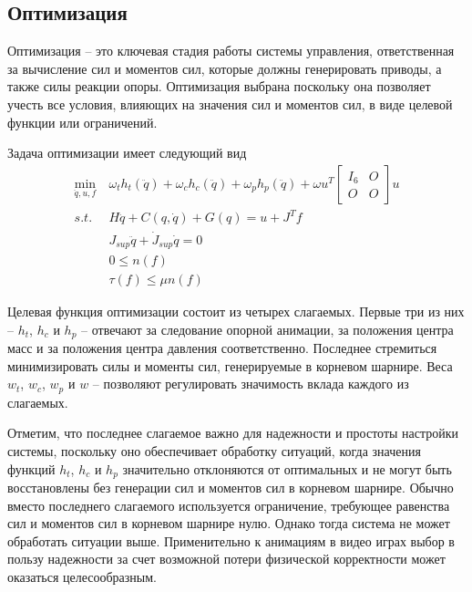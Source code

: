 \subsection{Оптимизация}

Оптимизация -- это ключевая стадия работы системы управления, ответственная за вычисление сил и моментов сил, которые должны генерировать приводы, а также силы реакции опоры. Оптимизация выбрана поскольку она позволяет учесть все условия, влияющих на значения сил и моментов сил, в виде целевой функции или ограничений.

Задача оптимизации имеет следующий вид
\begin{align*}
  \min_{\ddot{q}, u, f} &\ \omega_{t} h_{t}(\ddot{q}) + \omega_{c} h_{c}(\ddot{q}) + \omega_{p} h_{p}(\ddot{q}) + \omega u^{T} \begin{bmatrix} I_{6} & O \\ O & O \end{bmatrix} u \\
  s.t. &\ H \ddot{q} + C(q, \dot{q}) + G(q) = u + J^{T} f \tag{2.1}\label{eq:2.1} \\
       &\ J_{sup} \ddot{q} + \dot{J}_{sup} \dot{q} = 0 \tag{2.2}\label{eq:2.2} \\
       &\ 0 \le n(f) \tag{2.3}\label{ineq:2.3} \\
       &\ \tau(f) \le \mu n(f) \tag{2.4}\label{ineq:2.4}
\end{align*}

Целевая функция оптимизации состоит из четырех слагаемых. Первые три из них -- $h_{t}$, $h_{c}$ и $h_{p}$ -- отвечают за следование опорной анимации, за положения центра масс и за положения центра давления соответственно. Последнее стремиться минимизировать силы и моменты сил, генерируемые в корневом шарнире. Веса $w_{t}$, $w_{c}$, $w_{p}$ и $w$ -- позволяют регулировать значимость вклада каждого из слагаемых.

Отметим, что последнее слагаемое важно для надежности и простоты настройки системы, поскольку оно обеспечивает обработку ситуаций, когда значения функций $h_{t}$, $h_{c}$ и $h_{p}$ значительно отклоняются от оптимальных и не могут быть восстановлены без генерации сил и моментов сил в корневом шарнире. Обычно вместо последнего слагаемого используется ограничение, требующее равенства сил и моментов сил в корневом шарнире нулю. Однако тогда система не может обработать ситуации выше. Применительно к анимациям в видео играх выбор в пользу надежности за счет возможной потери физической корректности может оказаться целесообразным.


